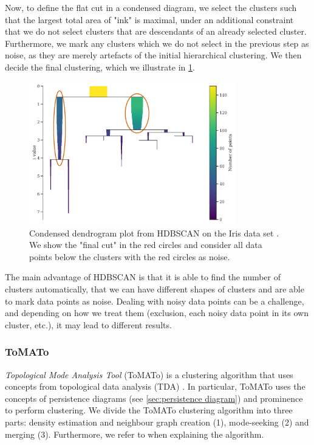 Now, to define the flat cut in a condensed diagram, we select the clusters such that the largest total area of "ink" is maximal, under an additional constraint that we do not select clusters that are descendants of an already selected cluster. Furthermore, we mark any clusters which we do not select in the previous step as noise, as they are merely artefacts of the initial hierarchical clustering. We then decide the final clustering, which we illustrate in \cref{fig:hdbscan-condensed-dendrogram-final-cut-example}.
\begin{figure}[H]
    \centering
    \includegraphics[width=0.8\textwidth]{thesis/figures/hdbscan-condensed-tree-final-cut-example.pdf}
    \caption{Condensed dendrogram plot from HDBSCAN on the Iris data set \cite{Anderson1936,Fisher1936}. We show the "final cut" in the red circles and consider all data points below the clusters with the red circles as noise.}
    \label{fig:hdbscan-condensed-dendrogram-final-cut-example}
\end{figure}

The main advantage of HDBSCAN is that it is able to find the number of clusters automatically, that we can have different shapes of clusters and are able to mark data points as noise. Dealing with noisy data points can be a challenge, and depending on how we treat them (exclusion, each noisy data point in its own cluster, etc.), it may lead to different results.

\subsubsection{ToMATo}
\label{sec:tomato-clustering}
\textit{Topological Mode Analysis Tool} (ToMATo) is a clustering algorithm that uses concepts from topological data analysis (TDA) \cite[p. 118-131]{Oudot2015}. In particular, ToMATo uses the concepts of persistence diagrams (see \cref{sec:persistence diagram}) and prominence to perform clustering. We divide the ToMATo clustering algorithm into three parts: density estimation and neighbour graph creation (1), mode-seeking (2) and merging (3). Furthermore, we refer to \cite[p. 118-131]{Oudot2015} when explaining the algorithm.

